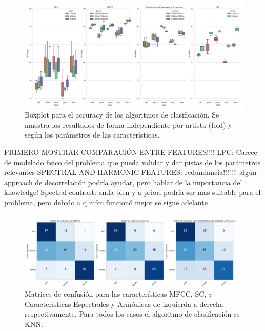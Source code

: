 \documentclass{article}
\begin{document}
\begin{figure}[H]
\begin{center}
\includegraphics[width=1\textwidth]{exp1_artista} 
\caption{Boxplot para el accuracy de los algoritmos de clasificación. Se muestra los resultados de forma independiente por artista (fold) y según los parámetros de las características.}
\label{fig:exp1_artista}
\end{center}
\end{figure}

PRIMERO MOSTRAR COMPARACIÓN ENTRE FEATURES!!!!
LPC: Carece de modelado fisico del problema que pueda validar y dar pistas de los parámetros relevantes
SPECTRAL AND HARMONIC FEATURES: redundancia!!!!!!! algún approach de decorrelación podría ayudar, pero hablar de la importancia del knowledge!
Spectral contrast: anda bien y a priori podría ser mas suitable para el problema, pero debido a q mfcc funcionó mejor se sigue adelante

\begin{figure}[H]
\begin{center}
\includegraphics[width=1\textwidth]{exp1_confusion} 
\caption{Matrices de confusión para las características MFCC, SC, y Características Espectrales y Armónicas de izquierda a derecha respectivamente. Para todos los casos el algoritmo de clasificación es KNN.}
\label{fig:exp1_confusion}
\end{center}
\end{figure}
\end{document}
